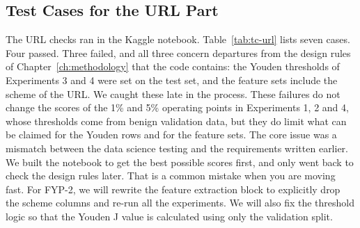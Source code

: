 \documentclass{FastFyp}
\begin{document}
\begin{table}[H]
	\centering
	\caption{Test cases for the email part: training checks.}
	\label{tab:tc-email-train}
	\footnotesize
\end{table}

\subsection{Test Cases for the URL Part}
\label{sec:test-url}
The URL checks ran in the Kaggle notebook. Table~\ref{tab:tc-url} lists seven cases. Four passed. Three failed, and all three concern departures from the design rules of Chapter~\ref{ch:methodology} that the code contains: the Youden thresholds of Experiments 3 and 4 were set on the test set, and the feature sets include the scheme of the URL. We caught these late in the process. These failures do not change the scores of the 1\% and 5\% operating points in Experiments 1, 2 and 4, whose thresholds come from benign validation data, but they do limit what can be claimed for the Youden rows and for the feature sets. The core issue was a mismatch between the data science testing and the requirements written earlier. We built the notebook to get the best possible scores first, and only went back to check the design rules later. That is a common mistake when you are moving fast. For FYP-2, we will rewrite the feature extraction block to explicitly drop the scheme columns and re-run all the experiments. We will also fix the threshold logic so that the Youden J value is calculated using only the validation split.
\end{document}
